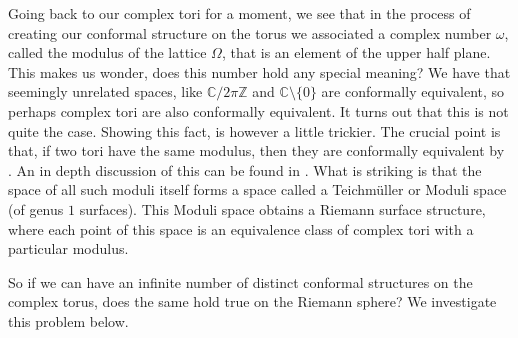 \documentclass[11pt]{report}
\theoremstyle{definition}
\begin{document}
Going back to our complex tori for a moment, we see that in the process of creating our conformal structure on the torus we associated a complex number $\omega$, called the modulus of the lattice $\Omega$, that is an element of the upper half plane. This makes us wonder, does this number hold any special meaning? We have that seemingly unrelated spaces, like $\mathbb{C}/2\pi \mathbb{Z}$ and $\mathbb{C}\setminus \{0\}$ are conformally equivalent, so perhaps complex tori are also conformally equivalent. It turns out that this is not quite the case. Showing this fact, is however a little trickier.  The crucial point is that, if two tori have the same modulus, then they are conformally equivalent by \cite[Theorem 6.1.4]{comfun}. An in depth discussion of this can be found in \cite[Section 6.1]{comfun}. What is striking is that the space of all such moduli itself forms a space called a Teichm\"{u}ller or Moduli space (of genus $1$ surfaces). This Moduli space obtains a Riemann surface structure, where each point of this space is an equivalence class of complex tori with a particular modulus.

So if we can have an infinite number of distinct conformal structures on the complex torus, does the same hold true on the Riemann sphere? We investigate this problem below.
\end{document}
